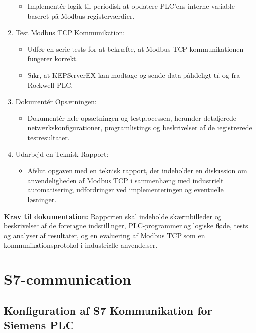 \begin{enumerate}
\begin{itemize}
		\item Implementér logik til periodisk at opdatere PLC'ens interne variable baseret på Modbus registerværdier.
	\end{itemize}
	\item Test Modbus TCP Kommunikation:
	\begin{itemize}
		\item Udfør en serie tests for at bekræfte, at Modbus TCP-kommunikationen fungerer korrekt.
		\item Sikr, at KEPServerEX kan modtage og sende data pålideligt til og fra Rockwell PLC.
	\end{itemize}
	\item Dokumentér Opsætningen:
	\begin{itemize}
		\item Dokumentér hele opsætningen og testprocessen, herunder detaljerede netværkskonfigurationer, programlistings og beskrivelser af de registrerede testresultater.
	\end{itemize}
	\item Udarbejd en Teknisk Rapport:
	\begin{itemize}
		\item Afslut opgaven med en teknisk rapport, der indeholder en diskussion om anvendeligheden af Modbus TCP i sammenhæng med industrielt automatisering, udfordringer ved implementeringen og eventuelle løsninger.
	\end{itemize}
\end{enumerate}
\textbf{Krav til dokumentation:} Rapporten skal indeholde skærmbilleder og beskrivelser af de foretagne indstillinger, PLC-programmer og logiske fløde, tests og analyser af resultater, og en evaluering af Modbus TCP som en kommunikationsprotokol i industrielle anvendelser.

\section{S7-communication}
\subsection*{Konfiguration af S7 Kommunikation for Siemens PLC}
\label{subsec:s7_comm_siemens}

